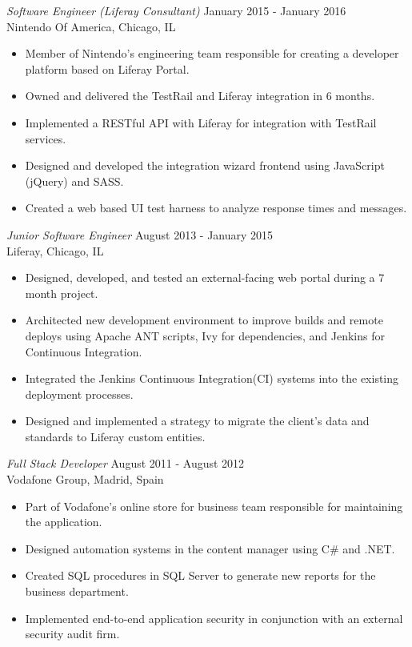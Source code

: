 \documentclass[overlapped, 10pt]{res} %
\begin{document}
\begin{resume}
{\sl Software Engineer (Liferay Consultant)} \hfill January 2015 - January 2016 \\
Nintendo Of America, Chicago, IL
\begin{itemize} 
\item Member of Nintendo’s engineering team responsible for creating a developer platform based on Liferay Portal.
\item Owned and delivered the TestRail and Liferay integration in 6 months.
\item Implemented a RESTful API with Liferay for integration with TestRail services.
\item Designed and developed the integration wizard frontend using JavaScript (jQuery) and SASS.
\item Created a web based UI test harness to analyze response times and messages.
\end{itemize} 

{\sl Junior Software Engineer} \hfill August 2013 - January 2015 \\
Liferay, Chicago, IL
\begin{itemize} 
\item Designed, developed, and tested an external-facing web portal during a 7 month project.
\item Architected new development environment to improve builds and remote deploys using Apache ANT scripts, Ivy for dependencies, and Jenkins for Continuous Integration.
\item Integrated the Jenkins Continuous Integration(CI) systems into the existing deployment processes.
\item Designed and implemented a strategy to migrate the client’s data and standards to Liferay custom entities.
\end{itemize} 

{\sl Full Stack Developer} \hfill August 2011 - August 2012 \\
Vodafone Group, Madrid, Spain
\begin{itemize} 
\item Part of Vodafone’s online store for business team responsible for maintaining the application.
\item Designed automation systems in the content manager using C\# and .NET.
\item Created SQL procedures in SQL Server to generate new reports for the business department.
\item Implemented end-to-end application security in conjunction with an external security audit firm.
\end{itemize} 


\end{resume}
\end{document}
